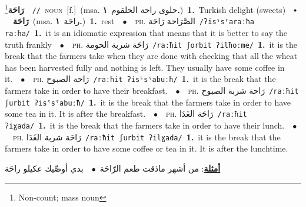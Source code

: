 \documentclass[10pt,a4paper,twoside]{article} %
\begin{document}
\begin{multicols}{2}
{\setlength\topsep{0pt}\textbf{\foreignlanguage{arabic}{رَاحَة}}\footnote{Non-count; mass noun}\ \ {\color{gray}\texttt{//}\color{black}}\ \textsc{noun}\ [f.]\ \color{gray}(msa. \foreignlanguage{arabic}{حلوى راحة الحلقوم}~\foreignlanguage{arabic}{\textbf{١.}})\color{black}\ \textbf{1.}~Turkish delight (sweets)\ \ $\smblkdiamond$\ \ \setlength\topsep{0pt}\textbf{\foreignlanguage{arabic}{رَاحَة}}\ \color{gray}(msa. \foreignlanguage{arabic}{راحَة}~\foreignlanguage{arabic}{\textbf{١.}})\color{black}\ \textbf{1.}~rest\ \ $\bullet$\ \ \textsc{ph.} \color{gray} \foreignlanguage{arabic}{الصَّرَاحة رَاحَة}\color{black}\ {\color{gray}\texttt{/{\sffamily ʔisˤsˤaraːħa raːħa}/}\color{black}}\ \textbf{1.}~it is an idiomatic expression that means that it is better to say the truth frankly\ \ $\bullet$\ \ \textsc{ph.} \color{gray} \foreignlanguage{arabic}{رَاحَة شربة الحومة}\color{black}\ {\color{gray}\texttt{/{\sffamily raːħit ʃorbit ʔilħoːme}/}\color{black}}\ \textbf{1.}~it is the break that the farmers take when they are done with checking that all the wheat has been harvested fully and nothing is left. They usually have some coffee in it.\ \ $\bullet$\ \ \textsc{ph.} \color{gray} \foreignlanguage{arabic}{رَاحة الصبوح}\color{black}\ {\color{gray}\texttt{/{\sffamily raːħit ʔisˤsˤabuːħ}/}\color{black}}\ \textbf{1.}~it is the break that the farmers take in order to have their breakfast.\ \ $\bullet$\ \ \textsc{ph.} \color{gray} \foreignlanguage{arabic}{رَاحة شربة الصبوح}\color{black}\ {\color{gray}\texttt{/{\sffamily raːħit ʃurbit ʔisˤsˤabuːħ}/}\color{black}}\ \textbf{1.}~it is the break that the farmers take in order to have some tea in it. It is after the breakfast.\ \ $\bullet$\ \ \textsc{ph.} \color{gray} \foreignlanguage{arabic}{رَاحَة الغَدَا}\color{black}\ {\color{gray}\texttt{/{\sffamily raːħit ʔiɣada}/}\color{black}}\ \textbf{1.}~it is the break that the farmers take in order to have their lunch.\ \ $\bullet$\ \ \textsc{ph.} \color{gray} \foreignlanguage{arabic}{رَاحَة شربة الغَدَا}\color{black}\ {\color{gray}\texttt{/{\sffamily raːħit ʃurbit ʔilɣada}/}\color{black}}\ \textbf{1.}~it is the break that the farmers take in order to have some coffee or tea in it. It is after the lunchtime.\  \begin{flushright}\color{gray}\foreignlanguage{arabic}{\textbf{\underline{\foreignlanguage{arabic}{أمثلة}}}: من أشهر ماذقت طعم الرّاحَة\ $\bullet$\ \  بدي أوصِّيك عكيلو راحَة}\end{flushright}\color{black}} \vspace{2mm}


\end{multicols}
\end{document}
